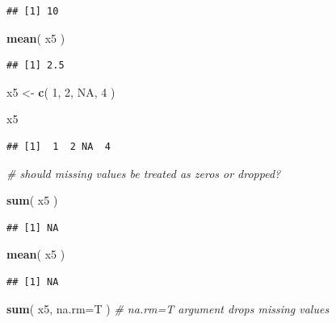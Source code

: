 \documentclass[]{book}
\newenvironment{Shaded}{\begin{snugshade}}{\end{snugshade}}
\newcommand{\CommentTok}[1]{\textcolor[rgb]{0.56,0.35,0.01}{\textit{#1}}}
\newcommand{\DataTypeTok}[1]{\textcolor[rgb]{0.13,0.29,0.53}{#1}}
\newcommand{\DecValTok}[1]{\textcolor[rgb]{0.00,0.00,0.81}{#1}}
\newcommand{\KeywordTok}[1]{\textcolor[rgb]{0.13,0.29,0.53}{\textbf{#1}}}
\newcommand{\NormalTok}[1]{#1}
\newcommand{\OtherTok}[1]{\textcolor[rgb]{0.56,0.35,0.01}{#1}}
\newcommand{\StringTok}[1]{\textcolor[rgb]{0.31,0.60,0.02}{#1}}
\theoremstyle{definition}
\theoremstyle{definition}
\theoremstyle{definition}
\theoremstyle{remark}
\begin{document}
\begin{verbatim}
## [1] 10
\end{verbatim}

\begin{Shaded}
\begin{Highlighting}[]
\KeywordTok{mean}\NormalTok{( x5 )}
\end{Highlighting}
\end{Shaded}

\begin{verbatim}
## [1] 2.5
\end{verbatim}

\begin{Shaded}
\begin{Highlighting}[]
\NormalTok{x5 <-}\StringTok{ }\KeywordTok{c}\NormalTok{( }\DecValTok{1}\NormalTok{, }\DecValTok{2}\NormalTok{, }\OtherTok{NA}\NormalTok{, }\DecValTok{4}\NormalTok{ )}

\NormalTok{x5}
\end{Highlighting}
\end{Shaded}

\begin{verbatim}
## [1]  1  2 NA  4
\end{verbatim}

\begin{Shaded}
\begin{Highlighting}[]
\CommentTok{# should missing values be treated as zeros or dropped? }

\KeywordTok{sum}\NormalTok{( x5 )}
\end{Highlighting}
\end{Shaded}

\begin{verbatim}
## [1] NA
\end{verbatim}

\begin{Shaded}
\begin{Highlighting}[]
\KeywordTok{mean}\NormalTok{( x5 )}
\end{Highlighting}
\end{Shaded}

\begin{verbatim}
## [1] NA
\end{verbatim}

\begin{Shaded}
\begin{Highlighting}[]
\KeywordTok{sum}\NormalTok{( x5, }\DataTypeTok{na.rm=}\NormalTok{T )   }\CommentTok{# na.rm=T argument drops missing values}
\end{Highlighting}
\end{Shaded}
\end{document}

